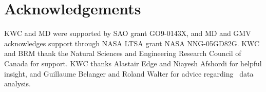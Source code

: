\documentclass[useAMS,usenatbib]{mn2e}
\begin{document}
\section*{Acknowledgements}

KWC and MD were supported by SAO grant GO9-0143X, and MD and GMV
acknowledges support through NASA LTSA grant NASA NNG-05GD82G. KWC and
BRM thank the Natural Sciences and Engineering Research Council of
Canada for support. KWC thanks Alastair Edge and Niayesh Afshordi for
helpful insight, and Guillaume Belanger and Roland Walter for advice
regarding \integral\ data analysis.






\clearpage
\onecolumn




\clearpage



\label{lastpage}
\end{document}
